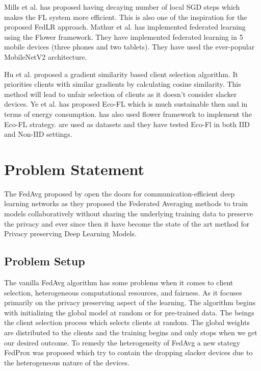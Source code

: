 \documentclass[conference]{IEEEtran}
\begin{document}
Mills et al. \cite{mills2023faster} has proposed having decaying number of local SGD steps which makes the FL system more efficient. This is also one of the inspiration for the proposed FedLR approach. Mathur et al. \cite{mathur2021device} has implemented federated learning using the Flower framework. They have implemented federated learning in 5 mobile devices (three phones and two tablets). They have used the ever-popular MobileNetV2 \cite{sandler2018mobilenetv2} architecture. 
\par  
Hu et al. \cite{hu2025federated} proposed a gradient similarity based client selection algorithm. It priorities clients with similar gradients by calculating cosine similarity. This method will lead to unfair selection of clients as it doesn't consider slacker devices. Ye et al. \cite{ye2022eco} has proposed Eco-FL which is much sustainable then \cite{mcmahan2017communication} and \cite{li2020federated} in terms of energy consumption. \cite{ye2022eco} has also used flower framework to implement the Eco-FL strategy. \cite{cifar10} \cite{Krizhevsky09learningmultiple} are used as datasets and they have tested Eco-Fl in both IID and Non-IID settings.

\section{Problem Statement}
The FedAvg proposed by \cite{mcmahan2017communication} open the doors for communication-efficient deep learning networks as they proposed the Federated Averaging methods to train models collaboratively without sharing the underlying training data to preserve the privacy and ever since then it have become the state of the art method for Privacy preserving Deep Learning Models. 
\subsection{Problem Setup} 
The vanilla FedAvg algorithm has some problems when it comes to client selection, heterogeneous computational resources, and fairness. As it focuses primarily on the privacy preserving aspect of the learning. The algorithm begins with initializing the global model at random or for pre-trained data. The beings the client selection process which selects clients at random. The global weights are distributed to the clients and the training begins and only stops when we get our desired outcome. To remedy the heterogeneity of FedAvg a new stategy FedProx \cite{li2020federated} was proposed which try to contain the dropping slacker devices due to the heterogeneous nature of the devices.
\end{document}
